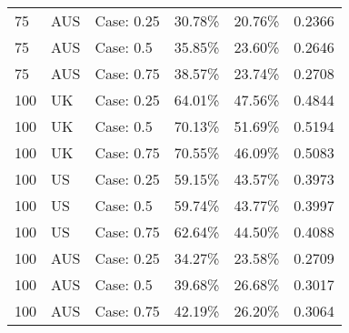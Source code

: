 \begin{table}[ht]
\begin{tabular}{llllll}
  75 & AUS & Case: 0.25 & 30.78\% & 20.76\% & 0.2366 \\ 
  75 & AUS & Case: 0.5 & 35.85\% & 23.60\% & 0.2646 \\ 
  75 & AUS & Case: 0.75 & 38.57\% & 23.74\% & 0.2708 \\ 
  100 & UK & Case: 0.25 & 64.01\% & 47.56\% & 0.4844 \\ 
  100 & UK & Case: 0.5 & 70.13\% & 51.69\% & 0.5194 \\ 
  100 & UK & Case: 0.75 & 70.55\% & 46.09\% & 0.5083 \\ 
  100 & US & Case: 0.25 & 59.15\% & 43.57\% & 0.3973 \\ 
  100 & US & Case: 0.5 & 59.74\% & 43.77\% & 0.3997 \\ 
  100 & US & Case: 0.75 & 62.64\% & 44.50\% & 0.4088 \\ 
  100 & AUS & Case: 0.25 & 34.27\% & 23.58\% & 0.2709 \\ 
  100 & AUS & Case: 0.5 & 39.68\% & 26.68\% & 0.3017 \\ 
  100 & AUS & Case: 0.75 & 42.19\% & 26.20\% & 0.3064 \\ 
   \hline
\end{tabular}
\end{table}

